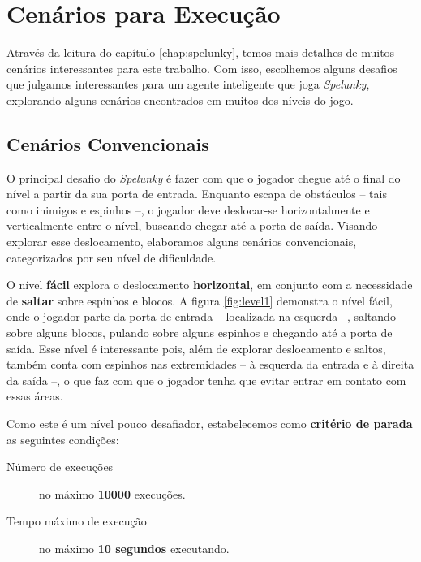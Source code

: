 \chapter{\label{chap:scenarios}Cenários para Execução}


Através da leitura do capítulo \ref{chap:spelunky}, temos mais detalhes de
muitos cenários interessantes para este trabalho. Com isso, escolhemos alguns
desafios que julgamos interessantes para um agente inteligente que joga
\textit{Spelunky}, explorando alguns cenários encontrados em muitos dos níveis
do jogo.

\section{Cenários Convencionais}

O principal desafio do \textit{Spelunky} é fazer com que o jogador chegue até
o final do nível a partir da sua porta de entrada. Enquanto escapa de
obstáculos -- tais como inimigos e espinhos --, o jogador deve deslocar-se
horizontalmente e verticalmente entre o nível, buscando chegar até a porta de
saída. Visando explorar esse deslocamento, elaboramos alguns cenários
convencionais, categorizados por seu nível de dificuldade.

O nível \textbf{fácil} explora o deslocamento \textbf{horizontal}, em conjunto
com a necessidade de \textbf{saltar} sobre espinhos e blocos. A figura
\ref{fig:level1} demonstra o nível fácil, onde o jogador parte da porta de
entrada -- localizada na esquerda --, saltando sobre alguns blocos, pulando
sobre alguns espinhos e chegando até a porta de saída. Esse nível é
interessante pois, além de explorar deslocamento e saltos, também conta com
espinhos nas extremidades -- à esquerda da entrada e à direita da saída --, o
que faz com que o jogador tenha que evitar entrar em contato com essas áreas.

Como este é um nível pouco desafiador, estabelecemos como \textbf{critério de
parada} as seguintes condições:

\begin{description}
    \item [Número de execuções] no máximo \textbf{10000} execuções.
    \item [Tempo máximo de execução] no máximo \textbf{10 segundos} executando.
\end{description}

